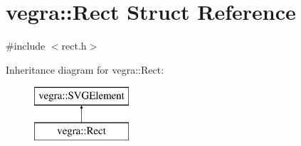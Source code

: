 \hypertarget{structvegra_1_1Rect}{}\section{vegra\+:\+:Rect Struct Reference}
\label{structvegra_1_1Rect}


{\ttfamily \#include $<$rect.\+h$>$}

Inheritance diagram for vegra\+:\+:Rect\+:\begin{figure}[H]
\begin{center}
\leavevmode
\includegraphics[height=2.000000cm]{structvegra_1_1Rect}
\end{center}
\end{figure}
